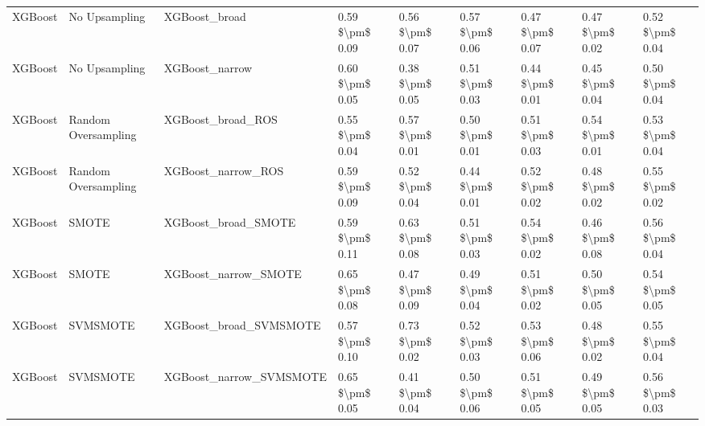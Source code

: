 \begin{tabular}{lllllllll}
                        XGBoost &                 No Upsampling &                                XGBoost\_broad &     0.59 \$\textbackslash pm\$ 0.09 &           0.56 \$\textbackslash pm\$ 0.07 &       0.57 \$\textbackslash pm\$ 0.06 &        0.47 \$\textbackslash pm\$ 0.07 &                         0.47 \$\textbackslash pm\$ 0.02 & 0.52 \$\textbackslash pm\$ 0.04 \\
                        XGBoost &                 No Upsampling &                               XGBoost\_narrow &     0.60 \$\textbackslash pm\$ 0.05 &           0.38 \$\textbackslash pm\$ 0.05 &       0.51 \$\textbackslash pm\$ 0.03 &        0.44 \$\textbackslash pm\$ 0.01 &                         0.45 \$\textbackslash pm\$ 0.04 & 0.50 \$\textbackslash pm\$ 0.04 \\
                        XGBoost &           Random Oversampling &                            XGBoost\_broad\_ROS &     0.55 \$\textbackslash pm\$ 0.04 &           0.57 \$\textbackslash pm\$ 0.01 &       0.50 \$\textbackslash pm\$ 0.01 &        0.51 \$\textbackslash pm\$ 0.03 &                         0.54 \$\textbackslash pm\$ 0.01 & 0.53 \$\textbackslash pm\$ 0.04 \\
                        XGBoost &           Random Oversampling &                           XGBoost\_narrow\_ROS &     0.59 \$\textbackslash pm\$ 0.09 &           0.52 \$\textbackslash pm\$ 0.04 &       0.44 \$\textbackslash pm\$ 0.01 &        0.52 \$\textbackslash pm\$ 0.02 &                         0.48 \$\textbackslash pm\$ 0.02 & 0.55 \$\textbackslash pm\$ 0.02 \\
                        XGBoost &                         SMOTE &                          XGBoost\_broad\_SMOTE &     0.59 \$\textbackslash pm\$ 0.11 &           0.63 \$\textbackslash pm\$ 0.08 &       0.51 \$\textbackslash pm\$ 0.03 &        0.54 \$\textbackslash pm\$ 0.02 &                         0.46 \$\textbackslash pm\$ 0.08 & 0.56 \$\textbackslash pm\$ 0.04 \\
                        XGBoost &                         SMOTE &                         XGBoost\_narrow\_SMOTE &     0.65 \$\textbackslash pm\$ 0.08 &           0.47 \$\textbackslash pm\$ 0.09 &       0.49 \$\textbackslash pm\$ 0.04 &        0.51 \$\textbackslash pm\$ 0.02 &                         0.50 \$\textbackslash pm\$ 0.05 & 0.54 \$\textbackslash pm\$ 0.05 \\
                        XGBoost &                      SVMSMOTE &                       XGBoost\_broad\_SVMSMOTE &     0.57 \$\textbackslash pm\$ 0.10 &           0.73 \$\textbackslash pm\$ 0.02 &       0.52 \$\textbackslash pm\$ 0.03 &        0.53 \$\textbackslash pm\$ 0.06 &                         0.48 \$\textbackslash pm\$ 0.02 & 0.55 \$\textbackslash pm\$ 0.04 \\
                        XGBoost &                      SVMSMOTE &                      XGBoost\_narrow\_SVMSMOTE &     0.65 \$\textbackslash pm\$ 0.05 &           0.41 \$\textbackslash pm\$ 0.04 &       0.50 \$\textbackslash pm\$ 0.06 &        0.51 \$\textbackslash pm\$ 0.05 &                         0.49 \$\textbackslash pm\$ 0.05 & 0.56 \$\textbackslash pm\$ 0.03 \\
\bottomrule
\end{tabular}
